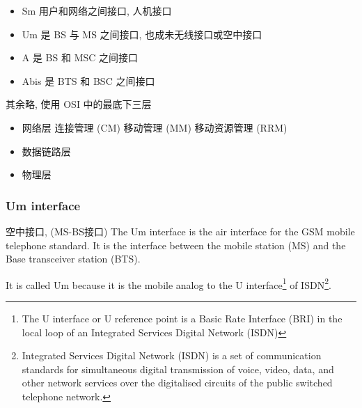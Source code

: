\documentclass[a4paper]{report}
\begin{document}
\begin{itemize}
	\item Sm 用户和网络之间接口, 人机接口
	\item Um 是 BS 与 MS 之间接口, 也成未无线接口或空中接口
	\item A 是 BS 和 MSC 之间接口
	\item Abis 是 BTS 和 BSC 之间接口
\end{itemize}
其余略, 使用 OSI 中的最底下三层
\begin{itemize}
	\item 网络层
	\subitem 连接管理 (CM)
	\subitem 移动管理 (MM)
	\subitem 移动资源管理 (RRM)
	\item 数据链路层
	\item 物理层
\end{itemize}
\subsubsection{Um interface}
空中接口, (MS-BS接口) The Um interface is the air interface for the GSM mobile telephone standard. It is the interface between the mobile station (MS) and the Base transceiver station (BTS).

 It is called Um because it is the mobile analog to the U interface\footnote{The U interface or U reference point is a Basic Rate Interface (BRI) in the local loop of an Integrated Services Digital Network (ISDN)} of ISDN\footnote{Integrated Services Digital Network (ISDN) is a set of communication standards for simultaneous digital transmission of voice, video, data, and other network services over the digitalised circuits of the public switched telephone network.}. 
\end{document}

